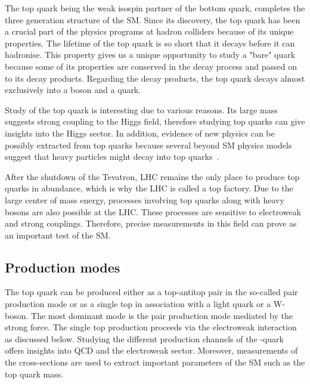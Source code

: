 The top quark being the weak isospin partner of the bottom quark, completes the three 
generation structure of the SM. Since its discovery, the top quark has been a crucial part of
the physics programs at hadron colliders because of its unique properties. The lifetime of the top quark
is so short that it decays before it can hadronise. This property gives us a unique opportunity 
to study a "bare" quark because some of its properties are conserved in the decay process and 
passed on to its decay products. Regarding the decay products, the top quark decays almost exclusively
into a \PW boson and a \Pbottom quark. 

Study of the top quark is interesting due to various reasons. Its large mass suggests strong coupling to
the Higgs field, therefore studying top quarks can give insights into the Higgs sector. In addition, 
evidence of new physics can be possibly extracted from top quarks because
several beyond SM physics models suggest that heavy particles might decay into top quarks~\cite{Gallinaro_2013}.

After the shutdown of the Tevatron, LHC remains the only place to produce top quarks in abundance,
which is why the LHC is called a top factory. Due to the large center of mass energy, processes
involving top quarks along with heavy bosons are also possible at the LHC. These processes
are sensitive to electroweak and strong couplings. Therefore, precise measurements in this field
can prove as an important test of the SM.


\subsection{Production modes}
The top quark can be produced either as a top-antitop pair in the so-called pair production mode
or as a single top in association with a light quark or a W-boson. The most dominant mode
is the pair production mode mediated by the strong force. The single top production proceeds via
the electroweak interaction as discussed below. Studying the different production channels of the
\Ptop-quark offers insights into QCD and the electroweak sector. Moreover, measurements of the 
cross-sections are used to extract important parameters of the SM such as the top quark mass. 




